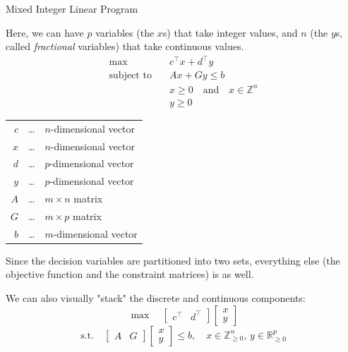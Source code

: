 \documentclass[a4paper, 11pt]{report}
\begin{document}
\begin{defframe}{Mixed Integer Linear Program}{}

Here, we can have $p$ variables (the $x$s) that take integer values, and $n$ (the $y$s, called \textit{fractional} variables) that take continuous values.
\begin{align*}
  \max \quad & c^\top x + d^\top  y \\
  \text{subject to} \quad & Ax + Gy \le b \\
  & x \ge 0 \quad \text{and} \quad x \in \mathbb{Z}^n\\
  & y \ge 0
\end{align*}

\begin{tabular}{r c l}
  $c$ & \dots & $n$-dimensional vector \\
  $x$ & \dots & $n$-dimensional vector \\
  $d$ & \dots & $p$-dimensional vector \\
  $y$ & \dots & $p$-dimensional vector \\
  $A$ & \dots & $m \times n$ matrix \\
  $G$ & \dots & $m \times p$ matrix \\
  $b$ & \dots & $m$-dimensional vector
\end{tabular}

\begin{gframe}{}
    Since the decision variables are partitioned into two sets, everything else (the objective function and the constraint matrices) is as well.
\end{gframe}

We can also visually "stack" the discrete and continuous components:
$$
  \max \quad \begin{bmatrix} c^\top & d^\top \end{bmatrix} \begin{bmatrix} x \\ y \end{bmatrix}
$$
$$
  \text{s.t.} \quad \begin{bmatrix} A & G \end{bmatrix} \begin{bmatrix} x \\ y \end{bmatrix} \le b, \quad x \in \mathbb{Z}_{\ge 0}^n, \, y \in \mathbb{R}_{\ge 0}^p
$$

\vspace{0.5em}
\begin{center}
\end{center}
\end{defframe}
\end{document}

